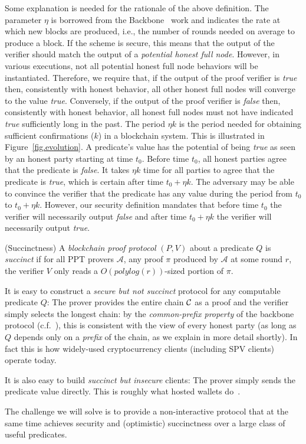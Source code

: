Some explanation is needed for the rationale of the above definition. The
parameter $\eta$ is borrowed from the Backbone~\cite{backbone} work and
indicates the rate at which new blocks are produced, i.e., the number of rounds
needed on average to produce a block. If the scheme is secure, this means that
the output of the verifier should match the output of a \emph{potential honest
full node}. However, in various executions, not all potential honest full node
behaviors will be instantiated. Therefore, we require that, if the output of the
proof verifier is \emph{true} then, consistently with honest behavior, all other
honest full nodes will converge to the value \emph{true}. Conversely, if the
output of the proof verifier is \emph{false} then, consistently with honest
behavior, all honest full nodes must not have indicated \emph{true} sufficiently
long in the past. The period $\eta k$ is the period needed for obtaining
sufficient confirmations ($k$) in a blockchain system. This is illustrated in
Figure~\ref{fig.evolution}. A predicate's value has the potential of being
\emph{true} as seen by an honest party starting at time $t_0$. Before time
$t_0$, all honest parties agree that the predicate is \emph{false}. It takes
$\eta k$ time for all parties to agree that the predicate is \emph{true}, which
is certain after time $t_0 + \eta k$. The adversary may be able to convince the
verifier that the predicate has any value during the period from $t_0$ to
$t_0 + \eta k$. However, our security definition mandates that before time $t_0$
the verifier will necessarily output \emph{false} and after time $t_0 + \eta k$
the verifier will necessarily output \emph{true}.

\begin{definition}{(Succinctness)}
A \emph{blockchain proof protocol} $(P, V)$ about a predicate $Q$ is
\emph{succinct} if for all PPT provers $\mathcal{A}$, any proof $\pi$ produced
by $\mathcal{A}$ at some round $r$, the verifier $V$ only reads a
$O(polylog(r))$-sized portion of $\pi$.
\end{definition}

It is easy to construct a \emph{secure but not succinct} protocol for any
computable predicate $Q$: The prover provides the entire chain $\mathcal{C}$ as a
proof and the verifier simply selects the longest chain: by the
\emph{common-prefix property} of the backbone protocol (c.f.~\cite{backbone}),
this is consistent with the view of every honest party (as long as $Q$ depends
only on a \emph{prefix} of the chain, as we explain in more detail shortly). In
fact this is how widely-used cryptocurrency clients (including SPV clients)
operate today.

It is also easy to build \emph{succinct but insecure} clients: The prover simply
sends the predicate value directly. This is roughly what hosted wallets
do~\cite{sok}.

The challenge we will solve is to provide a non-interactive protocol that at the
same time achieves security and (optimistic) succinctness over a large class of
useful predicates.
